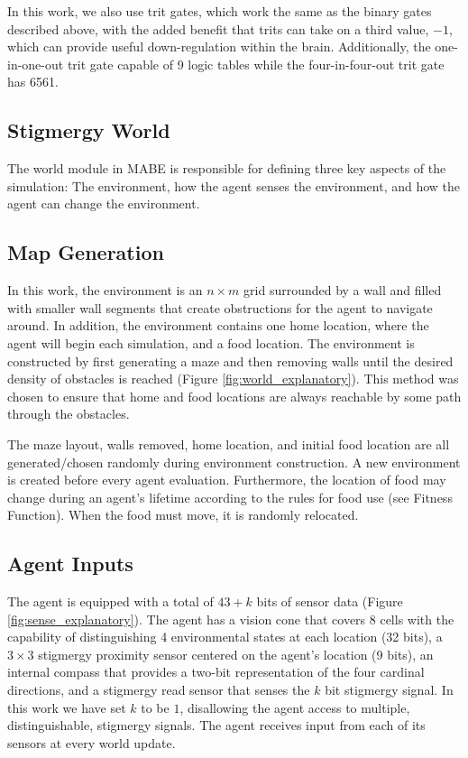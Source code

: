 In this work, we also use trit gates, which work the same as the binary gates described above, with the added benefit that trits can take on a third value, $-1$, which can provide useful down-regulation within the brain. Additionally, the one-in-one-out trit gate capable of 9 logic tables while the four-in-four-out trit gate has 6561.

\subsection {Stigmergy World} \label{world}

The world module in MABE is responsible for defining three key aspects of the simulation: The environment, how the agent senses the environment, and how the agent can change the environment.

\subsection*{Map Generation}

In this work, the environment is an $n\times m$ grid surrounded by a wall and filled with smaller wall segments that create obstructions for the agent to navigate around. In addition, the environment contains one home location, where the agent will begin each simulation, and a food location. The environment is constructed by first generating a maze and then removing walls until the desired density of obstacles is reached (Figure \ref{fig:world_explanatory}). This method was chosen to ensure that home and food locations are always reachable by some path through the obstacles.



The maze layout, walls removed, home location, and initial food location are all generated/chosen randomly during environment construction. A new environment is created before every agent evaluation. Furthermore, the location of food may change during an agent's lifetime according to the rules for food use (see Fitness Function). When the food must move, it is randomly relocated.

\subsection*{Agent Inputs}

The agent is equipped with a total of $43+k$ bits of sensor data (Figure \ref{fig:sense_explanatory}). The agent has a vision cone that covers 8 cells with the capability of distinguishing 4 environmental states at each location (32 bits), a $3\times 3$ stigmergy proximity sensor centered on the agent's location (9 bits), an internal compass that provides a two-bit representation of the four cardinal directions, and a stigmergy read sensor that senses the $k$ bit stigmergy signal. In this work we have set $k$ to be $1$, disallowing the agent access to multiple, distinguishable, stigmergy signals. The agent receives input from each of its sensors at every world update.

